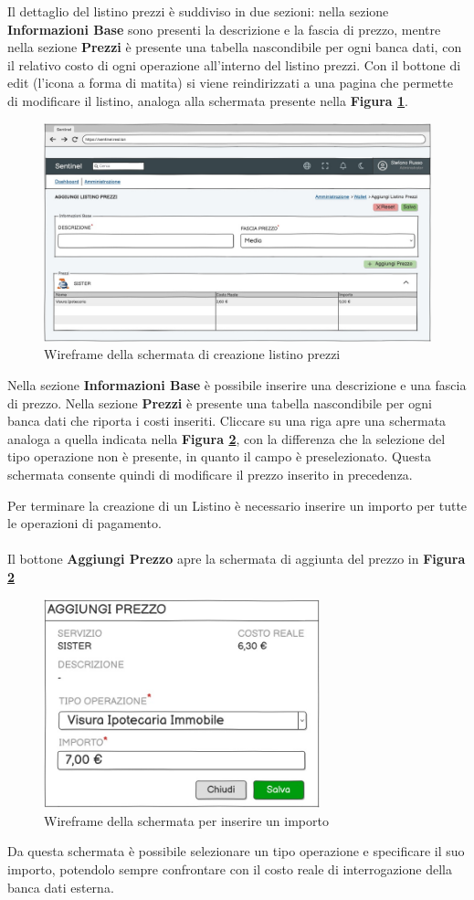 Il dettaglio del listino prezzi \`e suddiviso in due sezioni: nella sezione \textbf{Informazioni Base} sono presenti la descrizione e la fascia di prezzo, mentre nella sezione
\textbf{Prezzi} \`e presente una tabella nascondibile per ogni banca dati, con il relativo costo di ogni operazione all'interno del listino prezzi.
Con il bottone di edit (l'icona a forma di matita) si viene reindirizzati a una pagina che permette di modificare il listino, analoga alla schermata presente nella \textbf{Figura \ref{aggiungilistino}}.

\begin{figure}[H]
  \centering
  \includegraphics[width=12cm]{images/gestione-listini/add-listino.png}
  \caption{Wireframe della schermata di creazione listino prezzi}
  \label{aggiungilistino}
\end{figure}
Nella sezione \textbf{Informazioni Base} \`e possibile inserire una descrizione e una fascia di prezzo.
Nella sezione \textbf{Prezzi} \`e presente una tabella nascondibile per ogni banca dati che riporta i costi inseriti.
Cliccare su una riga apre una schermata analoga a quella indicata nella \textbf{Figura \ref{aggiungiprezzo}}, con la differenza che la selezione del tipo operazione
non \`e presente, in quanto il campo \`e preselezionato. Questa schermata consente quindi di modificare il prezzo inserito in precedenza.

\label{designinserimentoprezzi}Per terminare la creazione di un Listino \`e necessario inserire un importo per tutte le operazioni di pagamento.
\\\\
Il bottone \textbf{Aggiungi Prezzo} apre la schermata di aggiunta del prezzo in \textbf{Figura \ref{aggiungiprezzo}}
\begin{figure}[H]
  \centering
  \includegraphics[width=8cm]{images/gestione-listini/aggiungi-prezzo.png}
  \caption{Wireframe della schermata per inserire un importo}
  \label{aggiungiprezzo}
\end{figure}

Da questa schermata \`e possibile selezionare un tipo operazione e specificare il suo importo, potendolo sempre confrontare con il costo reale di interrogazione della banca dati esterna.
